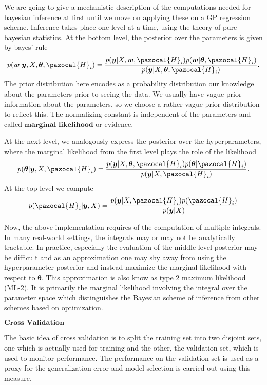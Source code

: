 \documentclass[12pt,a4paper,oneside]{book}
\theoremstyle{plain}
\theoremstyle{definition}
\begin{document}
{\vspace{3mm}
\noindent
We are going to give a mechanistic description of the computations needed for bayesian inference at first until we move on applying these on a GP regression scheme. Inference takes place one level at a time, using the theory of pure bayesian statistics. At the bottom level, the posterior over the parameters is given by bayes' rule $$p(\bm{w}|\bm{y},X,\bm{\theta},\pazocal{H}_i)=\frac{p(\bm{y}|X,\bm{w},\pazocal{H}_i)p(\bm{w}|\bm{\theta},\pazocal{H}_i)}{p(\bm{y}|X,\bm{\theta},\pazocal{H}_i)}.$$ The prior distribution here encodes as a probability distribution our knowledge about the parameters prior to seeing the data. We usually have vague prior information about the parameters, so we choose a rather vague prior distribution to reflect this. The normalizing constant is independent of the parameters and called $\textbf{marginal likelihood}$ or evidence.

\vspace{3mm}
\noindent
At the next level, we analogously express the posterior over the hyperparameters, where the marginal likelihood from the first level plays the role of the likelihood
$$p(\bm{\theta}|\bm{y},X,\pazocal{H}_i)=\frac{p(\bm{y}|X,\bm{\theta},\pazocal{H}_i)p(\bm{\theta}|\pazocal{H}_i)}{p(\bm{y}|X,\pazocal{H}_i)}.$$ At the top level we compute 
$$p(\pazocal{H}_i|\bm{y},X)=\frac{p(\bm{y}|X,\pazocal{H}_i)p(\pazocal{H}_i)}{p(\bm{y}|X)}$$

\vspace{3mm}
\noindent
Now, the above implementation requires of the computation of multiple integrals. In many real-world settings, the integrals may or may not be analytically tractable. In practice, especially the evaluation of the middle level posterior may be difficult and as an approximation one may shy away from using the hyperparameter posterior and instead maximize the marginal likelihood with respect to $\bm{\theta}.$ This approximation is also know as type 2 maximum likelihood (ML-2).
It is primarily the marginal likelihood involving the integral over the parameter space which distinguishes the Bayesian scheme of inference from other schemes based on optimization. 
\vspace{3mm}
\begin{flushleft}
$\textbf{Cross Validation}$
\end{flushleft}
\vspace{3mm}
The basic idea of cross validation is to split the training set into two disjoint sets, one which is actually used for training and the other, the validation set, which is used to monitor performance. The performance on the validation set is used as a proxy for the generalization error and model selection is carried out using this measure. 

}
\end{document}
